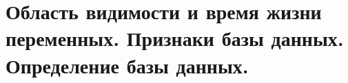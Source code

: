 {
	\section{Область видимости и время жизни переменных. Признаки базы данных. Определение базы данных.}
	\newpage
}
